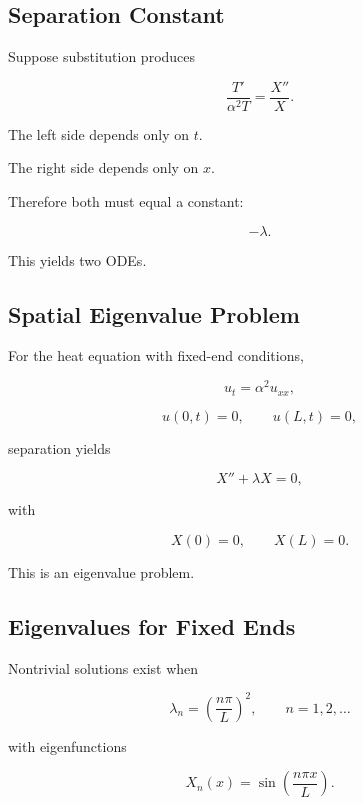 \subsection{Separation Constant}
\label{subsec:pde-separation-constant}

Suppose substitution produces

\[
\frac{T'}{\alpha^2T}
=
\frac{X''}{X}.
\]

The left side depends only on \(t\).

The right side depends only on \(x\).

Therefore both must equal a constant:

\[
\boxed{
-\lambda.
}
\]

This yields two ODEs.

\subsection{Spatial Eigenvalue Problem}
\label{subsec:pde-spatial-eigenvalue-problem}

For the heat equation with fixed-end conditions,

\[
u_t
=
\alpha^2u_{xx},
\]

\[
u(0,t)=0,
\qquad
u(L,t)=0,
\]

separation yields

\[
\boxed{
X''+\lambda X=0,
}
\]

with

\[
\boxed{
X(0)=0,
\qquad
X(L)=0.
}
\]

This is an eigenvalue problem.

\subsection{Eigenvalues for Fixed Ends}
\label{subsec:fixed-end-eigenvalues}

Nontrivial solutions exist when

\[
\boxed{
\lambda_n
=
\left(
\frac{n\pi}{L}
\right)^2,
\qquad
n=1,2,\ldots
}
\]

with eigenfunctions

\[
\boxed{
X_n(x)
=
\sin
\left(
\frac{n\pi x}{L}
\right).
}
\]


